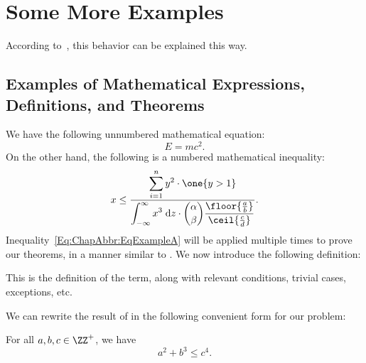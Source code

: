 
\section{Some More Examples}
\label{Section:ChapAbbr:SomeMoreExamples}

According to~\cite{IEEEexample:book_typical}, this behavior can be explained this way.
\lipsum[12]


\subsection{Examples of Mathematical Expressions, Definitions, and Theorems}
\label{Section:ChapAbbr:SomeMoreExamples:Math}

We have the following unnumbered mathematical equation:
\[
E=mc^2.
\]
On the other hand, the following is a numbered mathematical inequality:
\begin{align}
x \leq
\frac{\displaystyle\sum_{i=1}^{n} y^2 \cdot \one{y > 1}}
{\displaystyle\int_{-\infty}^{\infty} x^3 \;\text{d}z \cdot
\binom{\alpha}{\beta} \frac{\floor{\frac{a}{b}}}{\ceil{\frac{c}{d}}}}.
\label{Eq:ChapAbbr:EqExampleA}
\end{align}
Inequality~\eqref{Eq:ChapAbbr:EqExampleA} will be applied multiple times to prove our theorems, in a manner similar to \cite{IEEEexample:article_typical, IEEEexample:conf_typical}.
We now introduce the following definition:

\begin{Thm:Definition}
This is the definition of the term, along with relevant conditions, trivial cases, exceptions, etc.
\end{Thm:Definition}

We can rewrite the result of \cite[Theorem~2.5]{IEEEexample:conf_typical} in the following convenient form for our problem:

\begin{Thm:Proposition}
For all \mbox{$a,b,c\in\ZZ^+$}, we have
\label{Thm:Proposition:ChapAbbr:PropositionExample}
\[
a^2+b^3\leq c^4.
\]
\end{Thm:Proposition}


